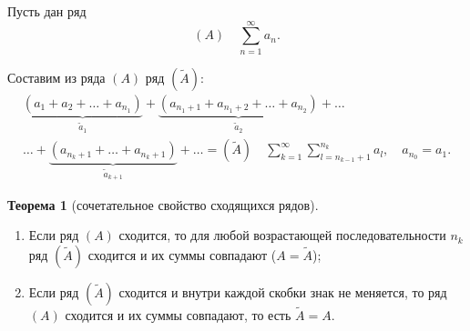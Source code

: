 \documentclass{report}
\theoremstyle{definition}
\newtheorem{theorem}{Теорема}[section]
\begin{document}
Пусть дан ряд
\begin{equation*}
  (A) \quad \sum_{n=1}^{\infty}a_n.
\end{equation*}

Составим из ряда $(A)$ ряд $(\widetilde{A})$:
\begin{multline*}
  \underbrace{(a_1 + a_2 + \ldots + a_{n_1})}_{\widetilde{a}_1} + \underbrace{(a_{n_1 + 1} + a_{n_1 + 2} + \ldots + a_{n_2})}_{\widetilde{a}_2} + \ldots \\
  \ldots + \underbrace{(a_{n_k + 1} + \ldots + a_{n_k + 1})}_{\widetilde{a}_{k+1}} + \ldots = (\widetilde{A}) \quad \sum_{k=1}^{\infty}\sum_{l=n_{k-1}+1}^{n_k} a_l, \quad a_{n_0} = a_1.
\end{multline*}

\begin{theorem}[сочетательное свойство сходящихся рядов]
  \begin{enumerate}
    \item Если ряд $(A)$ сходится, то для любой возрастающей последовательности $n_k$ ряд $(\widetilde{A})$ сходится и их суммы совпадают ($A = \widetilde{A}$);
    \item Если ряд $(\widetilde{A})$ сходится и внутри каждой  скобки знак не меняется, то ряд $(A)$ сходится и их суммы совпадают, то есть $\widetilde{A} = A$.
  \end{enumerate}
\end{theorem}
\end{document}

